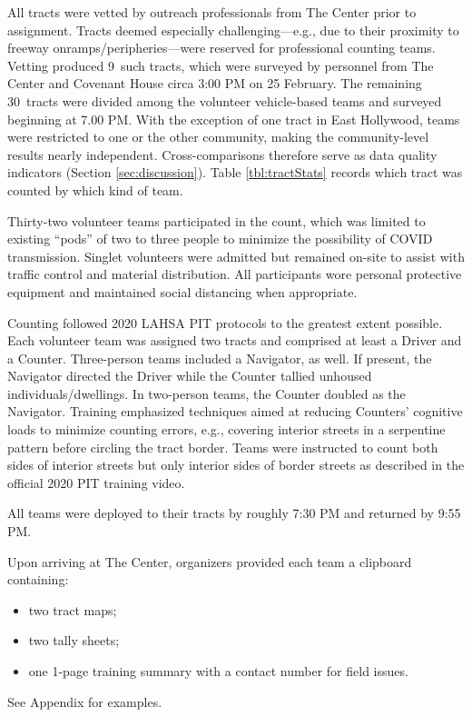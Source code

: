 \documentclass[11pt,twocolumn]{article}
\def\Count{count}
\def\nprof{9}
\def\nvol{30}
\begin{document}
All tracts were vetted by outreach professionals from The Center prior to assignment. Tracts 
deemed especially challenging---e.g., due to their proximity to freeway onramps/peripheries---were 
reserved for professional counting teams. Vetting produced \nprof\ such tracts, which were surveyed 
by personnel from The Center and Covenant House circa 3:00 PM on 25 February. The remaining \nvol\ 
tracts were divided among the volunteer vehicle-based teams and surveyed beginning at 7.00 PM. With 
the exception of one tract in East Hollywood, teams were restricted to one or the other community, 
making the community-level results nearly independent. Cross-comparisons therefore serve as data 
quality indicators (Section \ref{sec:discussion}). Table \ref{tbl:tractStats} records which tract was 
counted by which kind of team. 

Thirty-two volunteer teams participated in the \Count, which was limited to existing ``pods'' of two 
to three people to minimize the possibility of COVID transmission. Singlet volunteers were admitted 
but remained on-site to assist with traffic control and material distribution. All participants wore 
personal protective equipment and maintained social distancing when appropriate.

Counting followed 2020 LAHSA PIT protocols to the greatest extent possible. Each volunteer team 
was assigned two tracts and comprised at least a Driver and a Counter. Three-person teams 
included a Navigator, as well. If present, the Navigator directed the Driver while the Counter tallied 
unhoused individuals/dwellings. In two-person teams, the Counter doubled as the Navigator. Training 
emphasized techniques aimed at reducing Counters' cognitive loads to minimize counting errors, e.g., 
covering interior streets in a serpentine pattern before circling the tract border. Teams were instructed 
to count both sides of interior streets but only interior sides of border streets as described in the official 
2020 PIT training video.

All teams were deployed to their tracts by roughly 7:30 PM and returned by 9:55 PM.

Upon arriving at The Center, organizers provided each team a clipboard containing:
\begin{itemize}
	\item two tract maps;
	\item two tally sheets;
	\item one 1-page training summary with a contact number for field issues.
\end{itemize}
See Appendix for examples.
\end{document}
